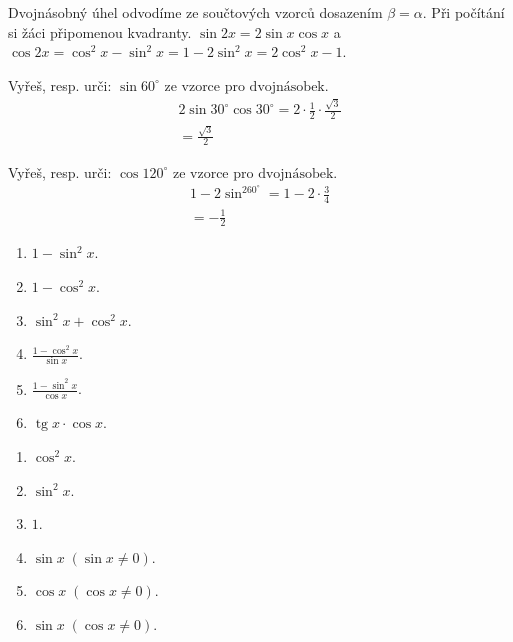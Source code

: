 \documentclass[11pt,a4paper]{article}
\begin{document}
Dvojnásobný úhel odvodíme ze součtových vzorců dosazením $\beta=\alpha$. Při počítání si žáci připomenou kvadranty.
$\sin2x=2\sin x\cos x$ a $\cos2x=\cos^2x-\sin^2x=1-2\sin^2x=2\cos^2x-1$.
\begin{prikladReseniBox}[title={Příklad 1}]
Vyřeš, resp. urči: $\sin60^\circ\text{ ze vzorce pro dvojnásobek}$.
\tcblower
\[\begin{aligned}2\sin30^\circ\cos30^\circ=2\cdot\frac{1}{2}\cdot\frac{\sqrt3}{2} \\ =\frac{\sqrt3}{2}\end{aligned}\]
\end{prikladReseniBox}
\begin{prikladReseniBox}[title={Příklad 2}]
Vyřeš, resp. urči: $\cos120^\circ\text{ ze vzorce pro dvojnásobek}$.
\tcblower
\[\begin{aligned}1-2\sin^260^\circ=1-2\cdot\frac{3}{4} \\ =-\frac{1}{2}\end{aligned}\]
\end{prikladReseniBox}
\begin{zadaniReseniBox}[title={Samostatná práce 1}]
\begin{enumerate}[label=\alph*)]
\item $1-\sin^2x$.
\item $1-\cos^2x$.
\item $\sin^2x+\cos^2x$.
\item $\frac{1-\cos^2x}{\sin x}$.
\item $\frac{1-\sin^2x}{\cos x}$.
\item $\operatorname{tg}x\cdot\cos x$.
\end{enumerate}
\tcblower
\begin{enumerate}[label=\alph*)]
\item $\cos^2x$.
\item $\sin^2x$.
\item $1$.
\item $\sin x\;(\sin x\ne0)$.
\item $\cos x\;(\cos x\ne0)$.
\item $\sin x\;(\cos x\ne0)$.
\end{enumerate}
\end{zadaniReseniBox}
\end{document}
